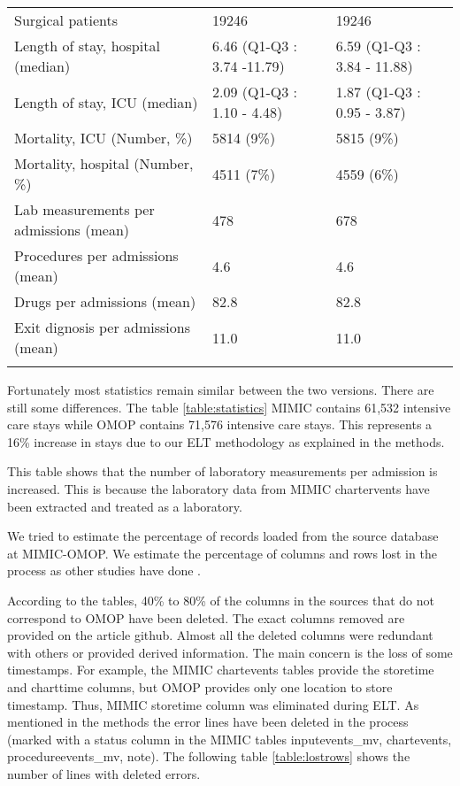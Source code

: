 \begin{table*}[t]
{\begin{tabular}{@{}lll@{}}
Surgical patients                      & 19246                       & 19246                              \\
Length of stay, hospital (median)      & 6.46 (Q1-Q3 : 3.74 -11.79)  & 6.59 (Q1-Q3 : 3.84 - 11.88)        \\
Length of stay, ICU (median)           & 2.09 (Q1-Q3 : 1.10 - 4.48)  & 1.87 (Q1-Q3 : 0.95 - 3.87)         \\
Mortality, ICU (Number, \%)            & 5814 (9\%)                  & 5815 (9\%)                         \\
Mortality, hospital (Number, \%)       & 4511 (7\%)                  & 4559 (6\%)                         \\
Lab measurements per admissions (mean) & 478                         & 678                                \\
Procedures per admissions (mean)       & 4.6                         & 4.6                                \\
Drugs per admissions (mean)            & 82.8                        & 82.8                               \\
Exit dignosis per admissions (mean)    & 11.0                        & 11.0                               \\\botrule
\end{tabular}}
\label{table:statistics}
\end{table*}

Fortunately most statistics remain similar between the two versions. 
There are still some differences. 
The table \ref{table:statistics} MIMIC contains 61,532 intensive care stays while 
OMOP contains 71,576 intensive care stays. This represents a 16\% increase in 
stays due to our ELT methodology as explained in the methods.
                    
This table shows that the number of laboratory measurements 
per admission is increased. This is because the laboratory data from MIMIC 
chartervents have been extracted and treated as a laboratory.

We tried to estimate the percentage of records loaded from the source database 
at MIMIC-OMOP. We estimate the percentage of columns and rows lost in 
the process as other studies have done \cite{omop-nashville}.
                    
According to the tables, 40\% to 80\% of the columns in the sources that do not 
correspond to OMOP have been deleted. The exact columns removed are provided 
on the article github. Almost all the deleted columns were redundant with others 
or provided derived information. The main concern is the loss of some timestamps. 
For example, the MIMIC chartevents tables provide the storetime and charttime columns, 
but OMOP provides only one location to store timestamp. Thus, MIMIC storetime 
column was eliminated during ELT. As mentioned in the methods the error lines 
have been deleted in the process (marked with a status column in the MIMIC tables 
inputevents\_mv, chartevents, procedureevents\_mv, note).
The following table \ref{table:lostrows} shows the number of lines with deleted 
errors.

